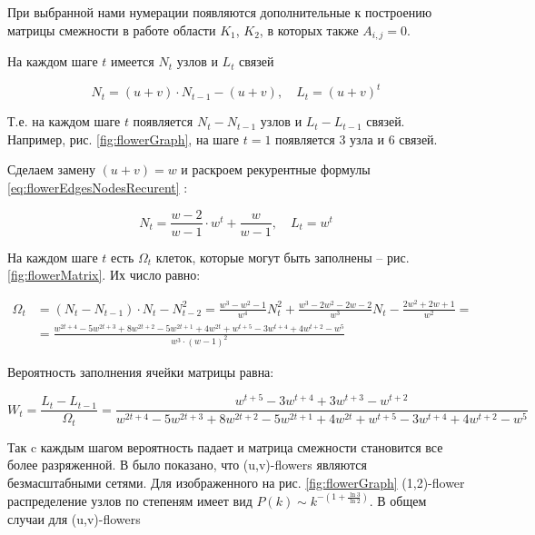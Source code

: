 \documentclass[10pt,aps,pra]{revtex4-1}
\begin{document}
При выбранной нами нумерации появляются дополнительные к построению матрицы смежности в работе \cite{Dor1} области $K_1$, $K_2$, в которых также $A_{i,j}=0$. 

На каждом шаге $t$ имеется $N_t$ узлов и $L_t$ связей \cite{Rozenfeld1}

\begin{equation}
\label{eq:flowerEdgesNodesRecurent}
N_t = (u+v) \cdot N_{t-1}-(u+v), \quad L_t=(u+v)^t
\end{equation}

Т.е. на каждом шаге $t$ появляется $N_t-N_{t-1}$ узлов и $L_t-L_{t-1}$ связей. Например, рис. \ref{fig:flowerGraph}, на шаге $t=1$ появляется 3 узла и 6 связей.

Сделаем замену $(u+v)=w$ и раскроем рекурентные формулы \ref{eq:flowerEdgesNodesRecurent} \cite{Rozenfeld1}:

\begin{equation}
\label{eq:flowerEdgesNodesOpenRecurent}
N_t = \frac{w-2}{w-1} \cdot w^t+\frac{w}{w-1}, \quad L_t=w^t
\end{equation}

На каждом шаге $t$ есть $\Omega_t$ клеток, которые могут быть заполнены – рис. \ref{fig:flowerMatrix}. Их число равно:

\begin{equation}
\label{eq:flowerEmpty}
\begin{split}
\Omega_{t} &=(N_t-N_{t-1}) \cdot N_t-N_{t-2}^2 = \frac{w^3-w^2-1}{w^4}N_t^2 + \frac{w^3-2w^2-2w-2}{w^3}N_t-\frac{2w^2+2w+1}{w^2} = \\
           &= \frac{w^{2t+4}-5w^{2t+3}+8w^{2t+2}-5w^{2t+1}+4w^{2t}+w^{t+5}-3w^{t+4}+4w^{t+2}-w^5}{w^{3} \cdot (w-1)^2}
\end{split}
\end{equation}

Вероятность заполнения ячейки матрицы равна:

\begin{equation}
W_t=\frac{L_t-L_{t-1}}{\Omega_t}=\frac{w^{t+5}-3w^{t+4}+3w^{t+3}-w^{t+2}}{w^{2t+4}-5w^{2t+3}+8w^{2t+2}-5w^{2t+1}+4w^{2t}+w^{t+5}-3w^{t+4}+4w^{t+2}-w^5}
\end{equation}

Так c каждым шагом вероятность падает и матрица смежности становится все более разряженной.
В \cite{Dor1} было показано, что (u,v)-flowers являются безмасштабными сетями. Для изображенного на рис. \ref{fig:flowerGraph} (1,2)-flower распределение узлов по степеням имеет вид $P(k) \sim k^{-(1+\frac{\ln{3}}{\ln{2}})}$. В общем случаи для (u,v)-flowers \cite{Rozenfeld1}
\end{document}
